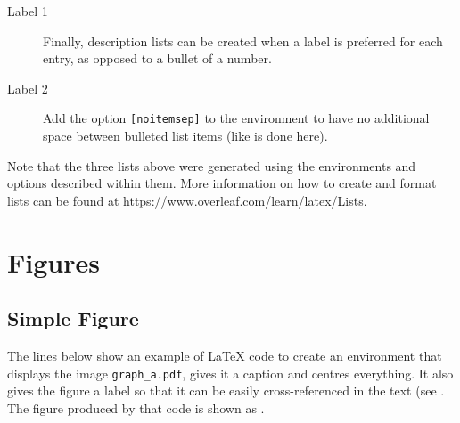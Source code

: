 \begin{description}
  \item[Label 1] Finally, description lists can be created when a label is preferred for each entry, as opposed to a bullet of a number.
  \item[Label 2] Add the option \verb|[noitemsep]| to the environment to have no additional space between bulleted list items (like is done here).
\end{description}
%
Note that the three lists above were generated using the environments and options described within them.
More information on how to create and format lists can be found at \url{https://www.overleaf.com/learn/latex/Lists}.



\section{Figures}
\label{sec:Figures}

\subsection{Simple Figure}
\label{sec:SimpleFigure}

The lines below show an example of \LaTeX{} code to create an environment that displays the image \verb|graph_a.pdf|, gives it a caption and centres everything. 
It also gives the figure a label so that it can be easily cross-referenced in the text (see . 
The figure produced by that code is shown as .

